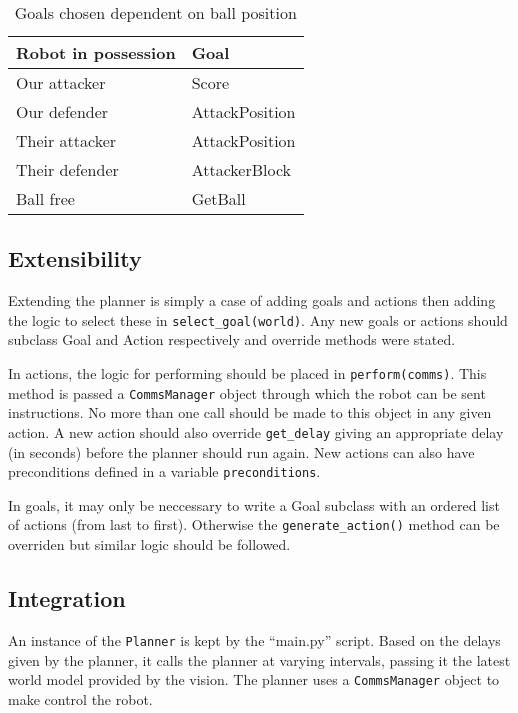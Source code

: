 \begin{table}[H]
\centering
\begin{tabular}{ l l}
\toprule
\textbf{Robot in possession} & \textbf{Goal} \\ \midrule
Our attacker & Score \\
Our defender & AttackPosition \\
Their attacker & AttackPosition \\
Their defender & AttackerBlock \\
Ball free & GetBall \\ \bottomrule
\end{tabular}
\caption{Goals chosen dependent on ball position}
\label{tbl:goals}
\end{table}

\subsection{Extensibility}

Extending the planner is simply a case of adding goals and actions then adding the logic to select these in \texttt{select\_goal(world)}. Any new goals or actions should subclass Goal and Action respectively and override methods were stated.

In actions, the logic for performing should be placed in \texttt{perform(comms)}. This method is passed a \texttt{CommsManager} object through which the robot can be sent instructions. No more than one call should be made to this object in any given action. A new action should also override \texttt{get\_delay} giving an appropriate delay (in seconds) before the planner should run again. New actions can also have preconditions defined in a variable \texttt{preconditions}.

In goals, it may only be neccessary to write a Goal subclass with an ordered list of actions (from last to first). Otherwise the \texttt{generate\_action()} method can be overriden but similar logic should be followed.

\subsection{Integration}

An instance of the \texttt{Planner} is kept by the ``main.py'' script. Based on the delays given by the planner, it calls the planner at varying intervals, passing it the latest world model provided by the vision. The planner uses a \texttt{CommsManager} object to make control the robot.

